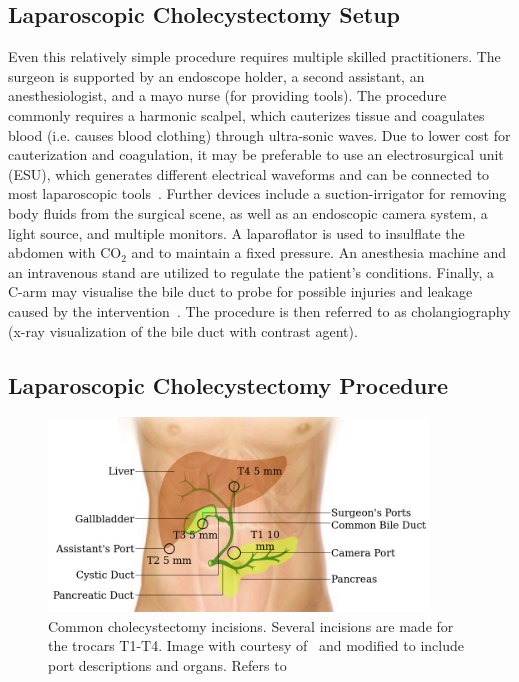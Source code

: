 \subsection{Laparoscopic Cholecystectomy Setup}
\label{in:sec:cholecystectomy_setup}

Even this relatively simple procedure requires multiple skilled practitioners. The surgeon is supported by an endoscope holder, a second assistant, an anesthesiologist, and a mayo nurse (for providing tools). The procedure commonly requires a harmonic scalpel, which cauterizes tissue and coagulates blood (i.e. causes blood clothing) through ultra-sonic waves. Due to lower cost for cauterization and coagulation, it may be preferable to use an electrosurgical unit (ESU), which generates different electrical waveforms and can be connected to most laparoscopic tools~\cite{archana2018comparing}. Further devices include a suction-irrigator for removing body fluids from the surgical scene, as well as an endoscopic camera system, a light source, and multiple monitors. A laparoflator is used to insulflate the abdomen with $\text{CO}_2$ and to maintain a fixed pressure. An anesthesia machine and an intravenous stand are utilized to regulate the patient's conditions. Finally, a C-arm may visualise the bile duct to probe for possible injuries and leakage caused by the intervention~\cite{cuschieri1994intraoperative}. The procedure is then referred to as cholangiography (x-ray visualization of the bile duct with contrast agent).

\subsection{Laparoscopic Cholecystectomy Procedure}
\label{in:sec:cholecystectomy_procedure}
\begin{figure}[tb]
    \centering
    \includegraphics[width=0.9\textwidth]{introduction/fig/24_01_26_cholecystectomy_incisions.jpg}
    \caption{Common cholecystectomy incisions. Several incisions are made for the trocars T1-T4. Image with courtesy of~\cite{ALES5766} and modified to include port descriptions and organs. Refers to }
    \label{in:fig:cholecystectomy_incisions}
\end{figure}

